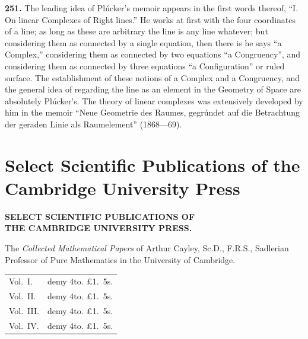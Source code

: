 \documentclass[12pt,a4paper]{article}
\theoremstyle{definition}
\begin{document}
\noindent\textbf{251.} The leading idea of Pl\'{u}cker's memoir appears in the first words thereof, ``I. On linear Complexes of Right lines.'' He works at first with the four coordinates of a line; as long as these are arbitrary the line is any line whatever; but considering them as connected by a single equation, then there is he says ``a Complex,'' considering them as connected by two equations ``a Congruency'', and considering them as connected by three equations ``a Configuration'' or ruled surface. The establishment of these notions of a Complex and a Congruency, and the general idea of regarding the line as an element in the Geometry of Space are absolutely Pl\'{u}cker's. The theory of linear complexes was extensively developed by him in the memoir ``Neue Geometrie des Raumes, gegr\'{u}ndet auf die Betrachtung der geraden Linie als Raumelement'' (1868---69).

\newpage


\section*{Select Scientific Publications of the Cambridge University Press}

\begin{center}
\Large\bfseries SELECT SCIENTIFIC PUBLICATIONS OF\\[0.5em]
THE CAMBRIDGE UNIVERSITY PRESS.
\end{center}

\vspace{1em}

\noindent The \textit{Collected Mathematical Papers} of Arthur Cayley, Sc.D., F.R.S., Sadlerian Professor of Pure Mathematics in the University of Cambridge.

\vspace{0.5em}

\begin{tabular}{ll}
Vol.~I. & demy 4to. \pounds1.~5s.\\
Vol.~II. & demy 4to. \pounds1.~5s.\\
Vol.~III. & demy 4to. \pounds1.~5s.\\
Vol.~IV. & demy 4to. \pounds1.~5s.
\end{tabular}
\end{document}

